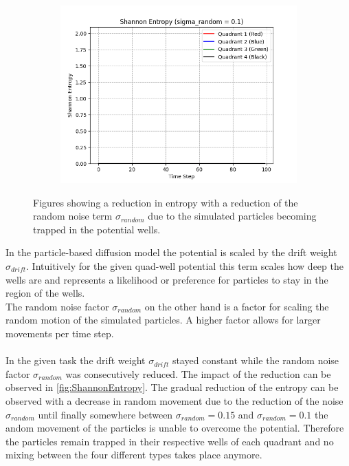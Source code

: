 \documentclass[]{scrartcl}
\begin{document}
\begin{figure}[h!]
\begin{subfigure}[c]{0.49\textwidth}
        \includegraphics[width=\linewidth]{Shannon_Entropy_(sigma_random_=_0.1).png}
    \end{subfigure}
    \caption{Figures showing a reduction in entropy with a reduction of the random noise term $\sigma_{random}$ due to the simulated particles becoming trapped in the potential wells.}
    \label{fig:ShannonEntropy}
\end{figure}

In the particle-based diffusion model the potential is scaled by the drift weight $\sigma_{drift}$. Intuitively for the given quad-well potential this term scales how deep the wells are and represents a likelihood or preference for particles to stay in the region of the wells.
\\
The random noise factor $\sigma_{random}$ on the other hand is a factor for scaling the random motion of the simulated particles. A higher factor allows for larger movements per time step.
\\ \\
In the given task the drift weight $\sigma_{drift}$ stayed constant while the random noise factor $\sigma_{random}$ was consecutively reduced. The impact of the reduction can be observed in \autoref{fig:ShannonEntropy}. The gradual reduction of the entropy can be observed with a decrease in random movement due to the reduction of the noise $\sigma_{random}$ until finally somewhere between $\sigma_{random}=0.15$ and $\sigma_{random}=0.1$ the andom movement of the particles is unable to overcome the potential. Therefore the particles remain trapped in their respective wells of each quadrant and no mixing between the four different types takes place anymore.
\end{document}
